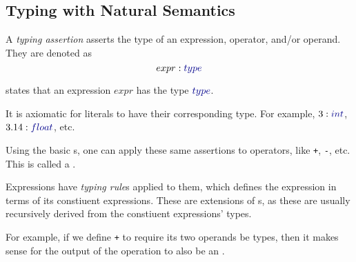 \subsection{Typing with Natural Semantics}\label{subsec:Natural_Semantics_Typing}
\begin{definition}\label{def:Typing_Assertion}
  A \emph{typing assertion} asserts the type of an expression, operator, and/or operand.
  They are denoted as
  \begin{equation}\label{eq:Typing_Assertion}
    expr : \SemanticType{type}
  \end{equation}

   states that an expression $expr$ has the type $\SemanticType{type}$.

  \begin{remark}\label{rmk:Typing_Assertion_Literals}
    It is axiomatic for literals to have their corresponding type.
    For example, $3 : \SemanticType{int}$, $3.14 : \SemanticType{float}$, etc.
  \end{remark}
\end{definition}

Using the basic s, one can apply these same assertions to operators, like \texttt{+}, \texttt{-}, etc.
This is called a .

\begin{definition}\label{def:Typing_Rule}
  Expressions have \emph{typing rule}s applied to them, which defines the expression in terms of its constiuent expressions.
  These are extensions of s, as these are usually recursively derived from the constiuent expressions' types.
\end{definition}

For example, if we define \texttt{+} to require its two operands be  types, then it makes sense for the output of the operation to also be an .
